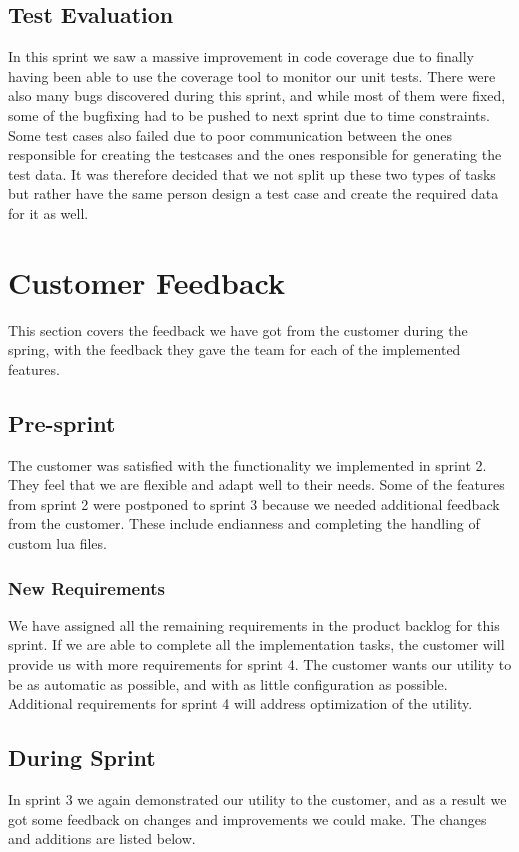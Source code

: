 \subsection{Test Evaluation}
In this sprint we saw a massive improvement in code coverage due to finally having been able to use the coverage tool to monitor our unit tests. There were also many bugs discovered during this sprint, and while most of them were fixed, some of the bugfixing had to be pushed to next sprint due to time constraints. Some test cases also failed due to poor communication between the ones responsible for creating the testcases and the ones responsible for generating the test data. It was therefore decided that we not split up these two types of tasks but rather have the same person design a test case and create the required data for it as well.


\section{Customer Feedback}
\label{sec:sp3:feedback}
This section covers the feedback we have got from the customer during the 
spring, with the feedback they gave the team for each of the implemented 
features.

\subsection{Pre-sprint}
The customer was satisfied with the functionality we implemented in sprint 2.
They feel that we are flexible and adapt well to their needs.
Some of the features from sprint 2 were postponed to sprint 3 because we needed additional feedback from the customer.
These include \gls{endianness} and completing the handling of custom \Gls{lua} files.

\subsubsection{New Requirements}
We have assigned all the remaining requirements in the product backlog for this sprint.
If we are able to complete all the implementation tasks, the customer will provide us with more requirements for sprint 4.
The customer wants our \gls{utility} to be as automatic as possible, and with as little configuration as possible. 
Additional requirements for sprint 4 will address optimization of the \gls{utility}.

\subsection{During Sprint}
In sprint 3 we again demonstrated our \gls{utility} to the customer, and as a result we got some feedback on changes
and improvements we could make. The changes and additions are listed below.

